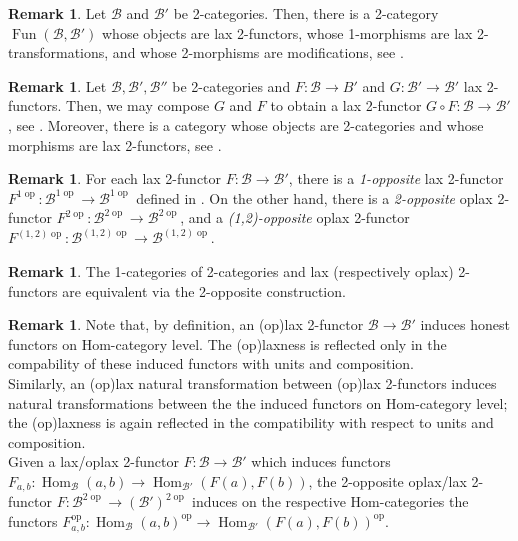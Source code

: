 \documentclass{article}
\newcommand{\opp}{\operatorname{op}}%
\newcommand{\Fun}{\operatorname{Fun}}%
\newcommand{\Hom}{\operatorname{Hom}}%
\newcommand{\B}{\mathcal{B}}
\numberwithin{equation}{section}
\theoremstyle{definition}
\newtheorem{remark}[definition]{Remark}
\theoremstyle{theorem}
\begin{document}
\begin{remark}
    Let $\B$ and $\B'$ be 2-categories. Then, there is a 2-category $\Fun(\B,\B')$ whose objects are lax 2-functors, whose 1-morphisms are lax 2-transformations, 
    and whose 2-morphisms are modifications, see \cite[Definition 4.4.10 \& Theorem 4.4.11]{johnson20202dimensionalcategories}.
\end{remark}
\begin{remark}
    Let $\B,\B',\B''$ be 2-categories and $F \colon \B \to B'$ and $G \colon \B' \to \B'$ lax 2-functors. Then, we may compose $G$ and $F$ to obtain a lax 
    2-functor $G \circ F \colon \B \to \B'$, see \cite[Definition 4.1.26 \& Lemma 4.1.29]{johnson20202dimensionalcategories}. Moreover, there is a category 
    whose objects are 2-categories and whose morphisms are lax 2-functors, see \cite[Theorem 4.1.30]{johnson20202dimensionalcategories}.
\end{remark}
\begin{remark}
    For each lax 2-functor $F \colon \B \to \B'$, there is a \emph{1-opposite} lax 2-functor $F^{1\opp} \colon \B^{1\opp} \to \B^{1\opp}$ defined 
    in \cite[Example 4.1.10]{johnson20202dimensionalcategories}. On the other hand, there is a \emph{2-opposite} oplax 2-functor 
    $F^{2\opp} \colon \B^{2\opp} \to \B^{2\opp}$, and a \emph{(1,2)-opposite} oplax 2-functor $F^{(1,2)\opp} \colon \B^{(1,2)\opp} \to \B^{(1,2)\opp}$.
\end{remark}
\begin{remark}
    The 1-categories of 2-categories and lax (respectively oplax) 2-functors are equivalent via the 2-opposite construction. 
\end{remark}
\begin{remark}\label{Remark: oplax 2-functors and local functors}
    Note that, by definition, an (op)lax 2-functor $\B \to \B'$ induces honest functors on Hom-category level. The (op)laxness is reflected only 
    in the compability of these induced functors with units and composition.\\
    Similarly, an (op)lax natural transformation between (op)lax 2-functors induces natural transformations between the the induced functors on 
    Hom-category level; the (op)laxness is again reflected in the compatibility with respect to units and composition.\\
    Given a lax/oplax 2-functor $F \colon \B \to \B'$ which induces functors $F_{a,b} \colon \Hom_{\B}(a,b) \to \Hom_{\B'}(F(a),F(b))$, the 2-opposite 
    oplax/lax 2-functor $F \colon \B^{2\opp} \to (\B')^{2\opp}$ induces on the respective Hom-categories the functors 
    $F_{a,b}^{\opp} \colon \Hom_{\B}(a,b)^{\opp} \to \Hom_{\B'}(F(a),F(b))^{\opp}$.
\end{remark}
\end{document}
